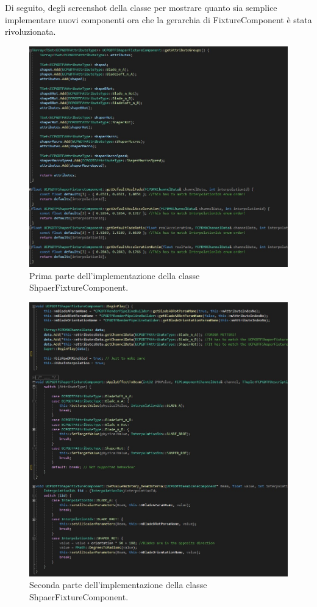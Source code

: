 \documentclass[main.tex]{subfiles}
\begin{document}
\clearpage %
Di seguito, degli screenshot della classe per mostrare quanto sia semplice implementare nuovi componenti ora che la gerarchia di FixtureComponent è stata rivoluzionata.
\begin{figure}[H]
    \centering
    \includegraphics[width=1\linewidth]{img/newFeatures/ShaperComponentCode1.jpg}
    \caption{Prima parte dell'implementazione della classe ShpaerFixtureComponent.}
    \label{fig:5_ShaperComponentCode1}
\end{figure}
\begin{figure}[H]
    \centering
    \includegraphics[width=1\linewidth]{img/newFeatures/ShaperComponentCode2.jpg}
    \caption{Seconda parte dell'implementazione della classe ShpaerFixtureComponent.}
    \label{fig:5_ShaperComponentCode2}
\end{figure}
\end{document}
